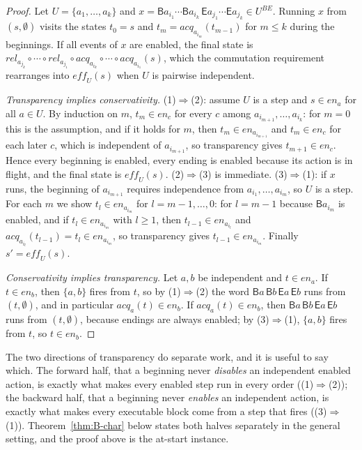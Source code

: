 \documentclass[preprint,12pt]{elsarticle}
\theoremstyle{plain}
\theoremstyle{definition}
\newcommand{\en}{\mathit{en}}
\newcommand{\eff}{\mathit{eff}}
\newcommand{\acq}{\mathit{acq}}
\newcommand{\rel}{\mathit{rel}}
\newcommand{\B}[1]{\mathsf{B}#1}
\newcommand{\E}[1]{\mathsf{E}#1}
\newcommand{\BE}[1]{#1^{\mathit{BE}}}
\begin{document}
\begin{proof}
Let $U = \{a_1, \dots, a_k\}$ and $x = \B{a_{i_1}} \cdots \B{a_{i_k}}\, \E{a_{j_1}} \cdots \E{a_{j_k}} \in \BE{U}$. Running $x$ from $(s, \emptyset)$ visits the states $t_0 = s$ and $t_m = \acq_{a_{i_m}}(t_{m-1})$ for $m \le k$ during the beginnings. If all events of $x$ are enabled, the final state is $\rel_{a_{j_k}} \circ \cdots \circ \rel_{a_{j_1}} \circ \acq_{a_{i_k}} \circ \cdots \circ \acq_{a_{i_1}}(s)$, which the commutation requirement rearranges into $\eff_U(s)$ when $U$ is pairwise independent.

\emph{Transparency implies conservativity.} (1)$\Rightarrow$(2): assume $U$ is a step and $s \in \en_a$ for all $a \in U$. By induction on $m$, $t_m \in \en_c$ for every $c$ among $a_{i_{m+1}}, \dots, a_{i_k}$: for $m = 0$ this is the assumption, and if it holds for $m$, then $t_m \in \en_{a_{i_{m+1}}}$ and $t_m \in \en_c$ for each later $c$, which is independent of $a_{i_{m+1}}$, so transparency gives $t_{m+1} \in \en_c$. Hence every beginning is enabled, every ending is enabled because its action is in flight, and the final state is $\eff_U(s)$. (2)$\Rightarrow$(3) is immediate. (3)$\Rightarrow$(1): if $x$ runs, the beginning of $a_{i_{m+1}}$ requires independence from $a_{i_1}, \dots, a_{i_m}$, so $U$ is a step. For each $m$ we show $t_l \in \en_{a_{i_m}}$ for $l = m-1, \dots, 0$: for $l = m-1$ because $\B{a_{i_m}}$ is enabled, and if $t_l \in \en_{a_{i_m}}$ with $l \ge 1$, then $t_{l-1} \in \en_{a_{i_l}}$ and $\acq_{a_{i_l}}(t_{l-1}) = t_l \in \en_{a_{i_m}}$, so transparency gives $t_{l-1} \in \en_{a_{i_m}}$. Finally $s' = \eff_U(s)$.

\emph{Conservativity implies transparency.} Let $a, b$ be independent and $t \in \en_a$. If $t \in \en_b$, then $\{a, b\}$ fires from $t$, so by (1)$\Rightarrow$(2) the word $\B{a}\,\B{b}\,\E{a}\,\E{b}$ runs from $(t, \emptyset)$, and in particular $\acq_a(t) \in \en_b$. If $\acq_a(t) \in \en_b$, then $\B{a}\,\B{b}\,\E{a}\,\E{b}$ runs from $(t, \emptyset)$, because endings are always enabled; by (3)$\Rightarrow$(1), $\{a, b\}$ fires from $t$, so $t \in \en_b$.
\end{proof}

The two directions of transparency do separate work, and it is useful to say which. The forward half, that a beginning never \emph{disables} an independent enabled action, is exactly what makes every enabled step run in every order ((1)$\Rightarrow$(2)); the backward half, that a beginning never \emph{enables} an independent action, is exactly what makes every executable block come from a step that fires ((3)$\Rightarrow$(1)). Theorem~\ref{thm:B-char} below states both halves separately in the general setting, and the proof above is the at-start instance.
\end{document}
